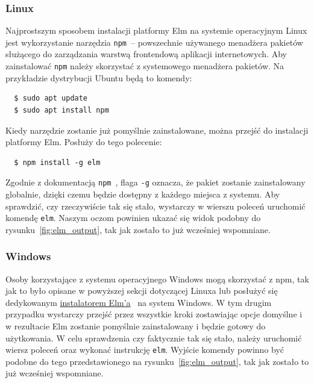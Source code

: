 \documentclass[twoside,a4paper]{report}
\begin{document}
\subsubsection{Linux}
Najprostszym sposobem instalacji platformy Elm na systemie operacyjnym Linux jest wykorzystanie narzędzia \texttt{npm}~-- powszechnie używanego menadżera pakietów służącego do zarządzania warstwą frontendową aplikacji internetowych.
Aby zainstalować \texttt{npm} należy skorzystać z systemowego menadżera pakietów.
Na przykładzie dystrybucji Ubuntu będą to komendy:
\begin{lstlisting}
  $ sudo apt update
  $ sudo apt install npm
\end{lstlisting}
Kiedy narzędzie zostanie już pomyślnie zainstalowane, można przejść do instalacji platformy Elm.
Posłuży do tego polecenie:
\begin{lstlisting}
  $ npm install -g elm
\end{lstlisting}
Zgodnie z dokumentacją \texttt{npm}~\cite{npmdocs}, flaga \texttt{-g} oznacza, że pakiet zostanie zainstalowany globalnie, dzięki czemu będzie dostępny z każdego miejsca z systemu.
Aby sprawdzić, czy rzeczywiście tak się stało, wystarczy w wierszu poleceń uruchomić komendę \texttt{elm}.
Naszym oczom powinien ukazać się widok podobny do rysunku~\ref{fig:elm_output}, tak jak zostało to już wcześniej wspomniane.
\subsubsection{Windows}
Osoby korzystające z systemu operacyjnego Windows mogą skorzystać z npm, tak jak to było opisane w powyższej sekcji dotyczącej Linuxa lub posłużyć się dedykowanym \href{https://github.com/elm/compiler/releases/download/0.19.1/installer-for-windows.exe}{instalatorem Elm'a}~\cite{elm_installer} na system Windows.
W tym drugim przypadku wystarczy przejść przez wszystkie kroki zostawiając opcje domyślne i w rezultacie Elm zostanie pomyślnie zainstalowany i będzie gotowy do użytkowania.
W celu sprawdzenia czy faktycznie tak się stało, należy uruchomić wiersz poleceń oraz wykonać instrukcję \texttt{elm}. Wyjście komendy powinno być podobne do tego przedstawionego na rysunku~\ref{fig:elm_output}, tak jak zostało to już wcześniej wspomniane.
\end{document}
